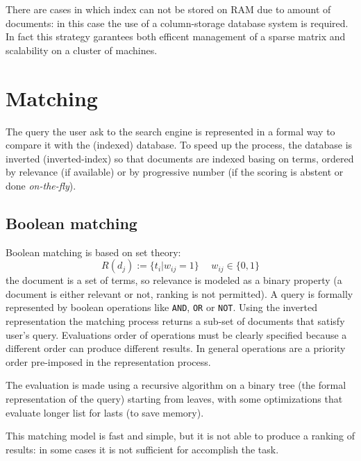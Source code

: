 \documentclass[11pt, a4page]{article}
\begin{document}
There are cases in which index can not be stored on RAM due to amount of documents: in this case the use of a column-storage database system is required.
In fact this strategy garantees both efficent management of a sparse matrix and scalability on a cluster of machines.


\section{Matching}
The query the user ask to the search engine is represented in a formal way to compare it with the (indexed) database.
To speed up the process, the database is inverted (inverted-index) so that documents are indexed basing on terms, ordered by relevance (if available) or by progressive number (if the scoring is abstent or done \textit{on-the-fly}).

\subsection{Boolean matching}
Boolean matching is based on set theory:
\begin{equation*}
  R(d_j) := \{t_i | w_{ij} = 1\} \hspace{15pt} w_{ij} \in \{0, 1\}
\end{equation*}
the document is a set of terms, so relevance is modeled as a binary property (a document is either relevant or not, ranking is not permitted).
A query is formally represented by boolean operations like \verb|AND|, \verb|OR| or \verb|NOT|.
Using the inverted representation the matching process returns a sub-set of documents that satisfy user's query.
Evaluations order of operations must be clearly specified because a different order can produce different results.
In general operations are a priority order pre-imposed in the representation process.

The evaluation is made using a recursive algorithm on a binary tree (the formal representation of the query) starting from leaves, with some optimizations that evaluate longer list for lasts (to save memory).

This matching model is fast and simple, but it is not able to produce a ranking of results: in some cases it is not sufficient for accomplish the task.
\end{document}
